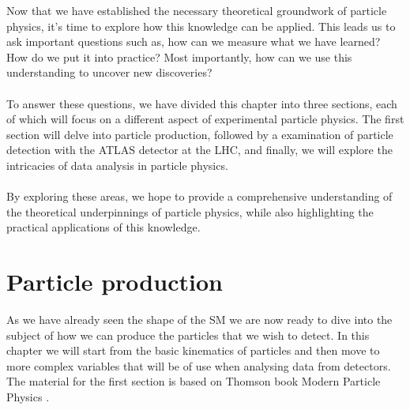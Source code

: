 \documentclass[14pt, a4paper]{book}
\begin{document}
Now that we have established the necessary theoretical groundwork of particle physics, it's time to explore how this knowledge can be applied. This leads us to ask important questions such as, 
how can we measure what we have learned? How do we put it into practice? Most importantly, how can we use this understanding to uncover new discoveries?\\
\\To answer these questions, we have divided this chapter into three sections, each of which will focus on a different aspect of experimental particle physics. The first section will delve into particle production, 
followed by a examination of particle detection with the ATLAS detector at the LHC, and finally, we will explore the intricacies of data analysis in particle physics.\\
\\By exploring these areas, we hope to provide a comprehensive understanding of the theoretical underpinnings of particle physics, while also highlighting the practical applications of this knowledge. 

\clearpage
\section{Particle production}
As we have already seen the shape of the SM we are now ready to dive into the subject of how we can produce the particles that we wish to detect. In this chapter we will start from the basic kinematics of particles 
and then move to more complex variables that will be of use when analysing data from detectors. The material for the first section is based on Thomson book Modern Particle Physics \cite{THOMSON}.
\end{document}

